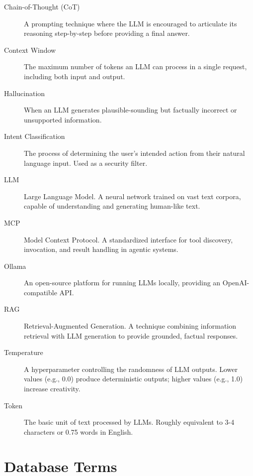 \documentclass[a4paper,twoside]{sapthesis}
\begin{document}
\begin{description}

\item[Chain-of-Thought (CoT)]
A prompting technique where the LLM is encouraged to articulate its reasoning step-by-step before providing a final answer.

\item[Context Window]
The maximum number of tokens an LLM can process in a single request, including both input and output.

\item[Hallucination]
When an LLM generates plausible-sounding but factually incorrect or unsupported information.

\item[Intent Classification]
The process of determining the user's intended action from their natural language input. Used as a security filter.

\item[LLM]
Large Language Model. A neural network trained on vast text corpora, capable of understanding and generating human-like text.

\item[MCP]
Model Context Protocol. A standardized interface for tool discovery, invocation, and result handling in agentic systems.

\item[Ollama]
An open-source platform for running LLMs locally, providing an OpenAI-compatible API.

\item[RAG]
Retrieval-Augmented Generation. A technique combining information retrieval with LLM generation to provide grounded, factual responses.

\item[Temperature]
A hyperparameter controlling the randomness of LLM outputs. Lower values (e.g., 0.0) produce deterministic outputs; higher values (e.g., 1.0) increase creativity.

\item[Token]
The basic unit of text processed by LLMs. Roughly equivalent to 3-4 characters or 0.75 words in English.

\end{description}

\section{Database Terms}
\label{app:glossary:database}
\end{document}
